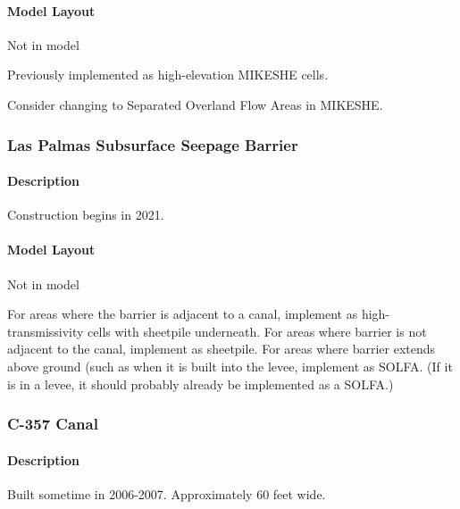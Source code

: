 \paragraph{Model Layout}
Not in model


\begin{notes}
Previously implemented as high-elevation MIKESHE cells.

Consider changing to Separated Overland Flow Areas in MIKESHE.
\end{notes}


\subsubsection{Las Palmas Subsurface Seepage Barrier}

\paragraph{Description}
Construction begins in 2021.

\paragraph{Model Layout}
Not in model


\begin{notes}
For areas where the barrier is adjacent to a canal, implement as high-transmissivity cells with sheetpile underneath.
For areas where barrier is not adjacent to the canal, implement as sheetpile.
For areas where barrier extends above ground (such as when it is built into the levee, implement as SOLFA. (If it is in a levee, it should probably already be implemented as a SOLFA.)
\end{notes}


\subsubsection{C-357 Canal}

\paragraph{Description}
Built sometime in 2006-2007.
Approximately 60 feet wide.

